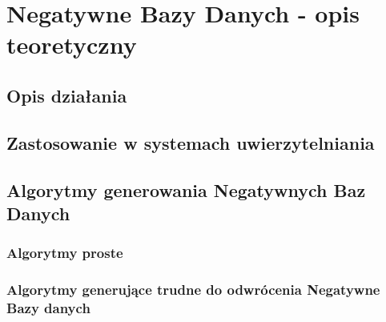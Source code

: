 \chapter{Negatywne Bazy Danych - opis teoretyczny}
\section{Opis działania}
\section{Zastosowanie w systemach uwierzytelniania}

\section{Algorytmy generowania Negatywnych Baz Danych}
\subsection{Algorytmy proste}
\subsection{Algorytmy generujące trudne do odwrócenia Negatywne Bazy danych}
